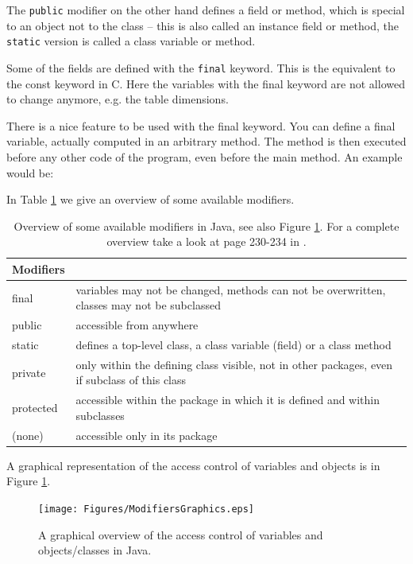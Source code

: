 The \verb|public| modifier
on the other hand defines a field or method, which is special to 
an object not to the class -- this is also called an instance field or
method, the \verb|static| version is called a class variable or
method.

Some of the fields are
defined with the \verb|final| keyword. This is the equivalent to the
const keyword in C. Here the variables with the final keyword are
not allowed to change anymore, e.g. the table dimensions. 

\begin{small}
There is a nice feature to be used with the final keyword. You can
define a final variable, actually computed in an arbitrary method. 
The method is then executed before any other code of the program,
even before the main method. An example would be:
 \end{small}



In Table \ref{tab:modifiers} we give an overview of some available modifiers.
\begin{table}[htbp]
  \begin{center}
    \leavevmode
    \begin{tabular}{l|p{8cm}}
     Modifiers &                                 \\ \hline \hline
     final & variables may not be changed, methods can not be overwritten,
             classes may not be subclassed\\\hline
     public & accessible from anywhere\\ \hline
     static & defines a top-level class, a class variable (field) or 
                 a class method\\\hline
     private & only within the defining class visible, not in other 
               packages, even if subclass of this class\\\hline
     protected & accessible within the package in which it is defined and
                 within subclasses\\\hline
     (none) & accessible only in its package\\
    \end{tabular}
    \caption{Overview of some available modifiers in Java, see also Figure
      \ref{fig:ModifiersGraphics}. For a complete
      overview take a look at page 230-234 in \cite{javanutshell}.}
    \label{tab:modifiers}
  \end{center}
\end{table}
A graphical representation of the access control of variables and
objects is in Figure \ref{fig:ModifiersGraphics}.
\begin{figure}[htbp]
  \begin{center}
    \texttt{[image: Figures/ModifiersGraphics.eps]}
    \caption{A graphical overview of the access 
      control of variables and objects/classes in Java.}
    \label{fig:ModifiersGraphics}
  \end{center}
\end{figure}

